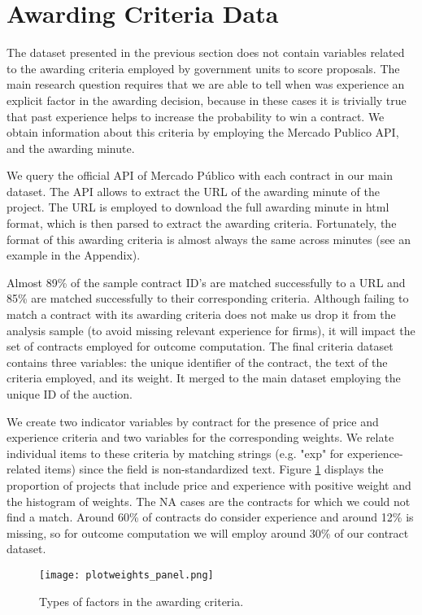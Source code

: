 \vspace{-5pt}
\section{Awarding Criteria Data}
The dataset presented in the previous section does not contain variables related to the awarding criteria employed by government units to score proposals. The main research question requires that we are able to tell when was experience an explicit factor in the awarding decision, because in these cases it is trivially true that past experience helps to increase the probability to win a contract. We obtain information about this criteria by employing the Mercado Publico API, and the awarding minute.

We query the official API of Mercado Público with each contract in our main dataset. The API allows to extract the URL of the awarding minute of the project. The URL is employed to download the full awarding minute in html format, which is then parsed to extract the awarding criteria. Fortunately, the format of this awarding criteria is almost always the same across minutes (see an example in the Appendix).

Almost 89\% of the sample contract ID's are matched successfully to a URL and 85\% are matched successfully to their corresponding criteria. Although failing to match a contract with its awarding criteria does not make us drop it from the analysis sample (to avoid missing relevant experience for firms), it will impact the set of contracts employed for outcome computation. The final criteria dataset contains three variables: the unique identifier of the contract, the text of the criteria employed, and its weight. It merged to the main dataset employing the unique ID of the auction.

We create two indicator variables by contract for the presence of price and experience criteria and two variables for the corresponding weights. We relate individual items to these criteria by matching strings (e.g. "exp" for experience-related items) since the field is non-standardized text. Figure \ref{fig:plotweights_panel} displays the proportion of projects that include price and experience with positive weight and the histogram of weights. The NA cases are the contracts for which we could not find a match. Around 60\% of contracts do consider experience and around 12\% is missing, so for outcome computation we will employ around 30\% of our contract dataset.

\begin{figure}
\centering
  \texttt{[image: plotweights\_panel.png]}
  \caption{\small Types of factors in the awarding criteria.}
  \label{fig:plotweights_panel}
\end{figure}
